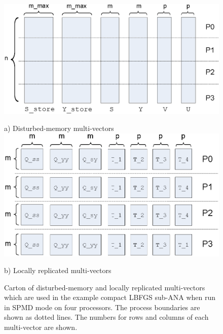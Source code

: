 {\bsinglespace
\begin{figure}
\begin{center}

\includegraphics*[angle=0,scale=0.60]{SPMD_Dist_MVs_P4}

a) Disturbed-memory multi-vectors \\[3ex]

\includegraphics*[angle=0,scale=0.60]{SPMD_Locally_Replicated_MVs_P4}

b) Locally replicated multi-vectors

\end{center}
\caption{
\label{tsfcore:fig:SPMD_Dist_MVs_P4}
Carton of disturbed-memory and locally replicated multi-vectors which
are used in the example compact LBFGS sub-ANA when run in SPMD mode on
four processors.  The process boundaries are shown as dotted lines.
The numbers for rows and columns of each multi-vector are shown.}
\end{figure}
\esinglespace}

